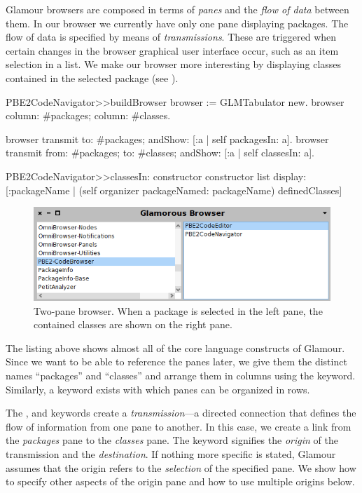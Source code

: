\documentclass[a4paper,10pt,twoside]{book}
\begin{document}
Glamour browsers are composed in terms of \emph{panes} and the
\emph{flow of data} between them. In our browser we currently have
only one pane displaying packages. The flow of data is specified by
means of \emph{transmissions}. These are triggered when certain
changes in the browser graphical user interface occur, such as an item selection in a list. We make our browser more interesting by displaying classes contained in the selected package (see ).

\begin{code}{}
PBE2CodeNavigator>>buildBrowser
  browser := GLMTabulator new.
  browser
    column: #packages;
    column: #classes.

  browser transmit to: #packages; andShow: [:a | self packagesIn: a].
  browser transmit from: #packages; to: #classes; andShow: [:a | self classesIn: a].

PBE2CodeNavigator>>classesIn: constructor
  constructor list
    display: [:packageName | (self organizer packageNamed: packageName) definedClasses]
\end{code}

\begin{figure}[htbp]
  \centerline{\includegraphics[width=\linewidth]{showclasses.png}}
  \caption{Two-pane browser. When a package is selected in the left
    pane, the contained classes are shown on the right pane.}
  \label{fig:showclasses}
\end{figure}

The listing above shows almost all of the core language constructs of
Glamour. Since we want to be able to reference the panes later, we
give them the distinct names ``packages'' and ``classes'' and arrange them
in columns using the  keyword. Similarly, a 
keyword exists with which panes can be organized in rows.

The ,  and  keywords create a
\emph{transmission}---a directed connection that defines the flow of
information from one pane to another. In this case, we create a link
from the \emph{packages} pane to the \emph{classes} pane. The
 keyword signifies the \emph{origin} of the transmission and
 the \emph{destination}. If nothing more specific is stated,
Glamour assumes that the origin refers to the \emph{selection} of the
specified pane. We show how to specify other aspects of the origin
pane and how to use multiple origins below.
\end{document}
